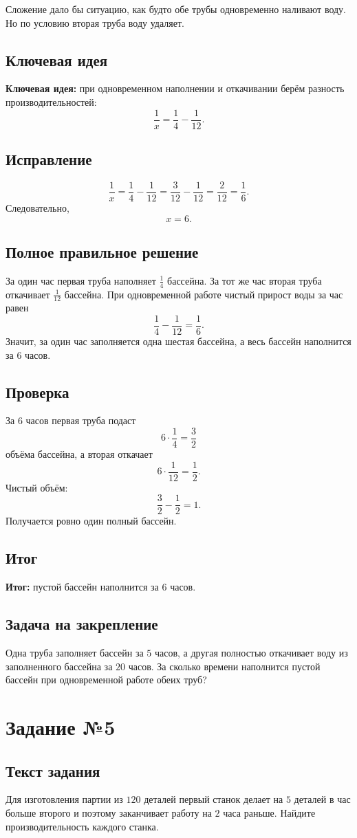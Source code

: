 \documentclass[12pt,a4paper]{article}
\newcommand{\idea}{\textcolor{blue!60!black}{\textbf{Ключевая идея:}}}
\newcommand{\result}{\textcolor{teal!60!black}{\textbf{Итог:}}}
\newcommand{\tasksection}[1]{\section*{Задание №#1}}
\begin{document}
Сложение дало бы ситуацию, как будто обе трубы одновременно наливают воду. Но по условию вторая труба воду удаляет.

\subsection*{Ключевая идея}
\idea{} при одновременном наполнении и откачивании берём разность производительностей:
\[
\frac{1}{x}=\frac{1}{4}-\frac{1}{12}.
\]

\subsection*{Исправление}
\[
\frac{1}{x}=\frac{1}{4}-\frac{1}{12}=\frac{3}{12}-\frac{1}{12}=\frac{2}{12}=\frac{1}{6}.
\]
Следовательно,
\[
x=6.
\]

\subsection*{Полное правильное решение}
За один час первая труба наполняет $\frac14$ бассейна. За тот же час вторая труба откачивает $\frac1{12}$ бассейна. При одновременной работе чистый прирост воды за час равен
\[
\frac14-\frac1{12}=\frac16.
\]
Значит, за один час заполняется одна шестая бассейна, а весь бассейн наполнится за $6$ часов.

\subsection*{Проверка}
За $6$ часов первая труба подаст
\[
6\cdot\frac14=\frac32
\]
объёма бассейна, а вторая откачает
\[
6\cdot\frac1{12}=\frac12.
\]
Чистый объём:
\[
\frac32-\frac12=1.
\]
Получается ровно один полный бассейн.

\subsection*{Итог}
\result{} пустой бассейн наполнится за $6$ часов.

\subsection*{Задача на закрепление}
Одна труба заполняет бассейн за $5$ часов, а другая полностью откачивает воду из заполненного бассейна за $20$ часов. За сколько времени наполнится пустой бассейн при одновременной работе обеих труб?

\newpage
{}\label{task:5}
\tasksection{5}
\subsection*{Текст задания}
Для изготовления партии из $120$ деталей первый станок делает на $5$ деталей в час больше второго и поэтому заканчивает работу на $2$ часа раньше. Найдите производительность каждого станка.
\end{document}

